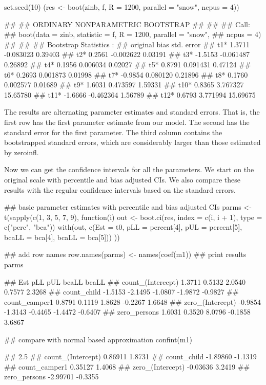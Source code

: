 set.seed(10)
(res <- boot(zinb, f, R = 1200, parallel = "snow", ncpus = 4))
 
## 
## ORDINARY NONPARAMETRIC BOOTSTRAP
## 
## 
## Call:
## boot(data = zinb, statistic = f, R = 1200, parallel = "snow", 
##     ncpus = 4)
## 
## 
## Bootstrap Statistics :
##      original    bias    std. error
## t1*    1.3711 -0.083023     0.39403
## t2*    0.2561 -0.002622     0.03191
## t3*   -1.5153 -0.061487     0.26892
## t4*    0.1956  0.006034     0.02027
## t5*    0.8791  0.091431     0.47124
## t6*    0.2693  0.001873     0.01998
## t7*   -0.9854  0.080120     0.21896
## t8*    0.1760  0.002577     0.01689
## t9*    1.6031  0.473597     1.59331
## t10*   0.8365  3.767327    15.65780
## t11*  -1.6666 -0.462364     1.56789
## t12*   0.6793  3.771994    15.69675
 
The results are alternating parameter estimates and standard errors. That is, the first row has the first parameter estimate from our model. The second has the standard error for the first parameter. The third column contains the bootstrapped standard errors, which are considerably larger than those estimated by zeroinfl.

Now we can get the confidence intervals for all the parameters. We start on the original scale with percentile and bias adjusted CIs. We also compare these results with the regular confidence intervals based on the standard errors.



## basic parameter estimates with percentile and bias adjusted CIs
parms <- t(sapply(c(1, 3, 5, 7, 9), function(i) {
  out <- boot.ci(res, index = c(i, i + 1), type = c("perc", "bca"))
  with(out, c(Est = t0, pLL = percent[4], pUL = percent[5],
    bcaLL = bca[4], bcaLL = bca[5]))
}))

## add row names
row.names(parms) <- names(coef(m1))
## print results
parms
 
##                       Est     pLL     pUL   bcaLL   bcaLL
## count_(Intercept)  1.3711  0.5132  2.0540  0.7577  2.3268
## count_child       -1.5153 -2.1495 -1.0807 -1.9872 -0.9827
## count_camper1      0.8791  0.1119  1.8628 -0.2267  1.6648
## zero_(Intercept)  -0.9854 -1.3143 -0.4465 -1.4472 -0.6407
## zero_persons       1.6031  0.3520  8.0796 -0.1858  3.6867
 
## compare with normal based approximation
confint(m1)
 
##                      2.5 %
## count_(Intercept)  0.86911  1.8731
## count_child       -1.89860 -1.1319
## count_camper1      0.35127  1.4068
## zero_(Intercept)  -0.03636  3.2419
## zero_persons      -2.99701 -0.3355
 

